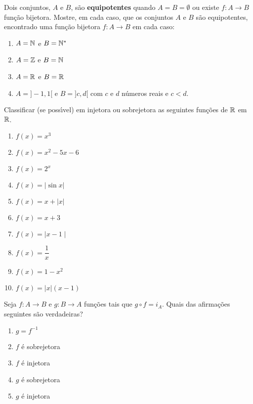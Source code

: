\documentclass[12pt]{exam}
\begin{document}
\vspace{.3cm}

\questao{} Dois conjuntos, $A$ e $B$, s\~ao \textbf{equipotentes} quando $A = B = \emptyset$ ou existe $f : A \to B$ fun\c{c}\~ao	bijetora. Mostre, em cada caso, que os conjuntos $A$ e $B$ s\~ao equipotentes, encontrado uma fun\c{c}\~ao bijetora $f : A \to B$ em cada caso:
\begin{enumerate}[label={\alph*})]
	\item $A = \mathbb{N}$ e $B = \mathbb{N}^*$
	\item $A = \mathbb{Z}$ e $B = \mathbb{N}$
	\item $A = \mathbb{R}$ e $B = \mathbb{R}$
	\item $A = ]-1, 1[$ e $B = ]c,d[$ com $c$ e $d$ n\'umeros reais e $c < d$.
\end{enumerate}

\newpage

\questao{} Classificar (se poss{\'\i}vel) em injetora ou sobrejetora as seguintes fun{\c c}{\~o}es de $\mathbb{R}$ em $\mathbb{R}$.

\begin{multicols}{2}
	\begin{enumerate}[label={\alph*})]
		\item $f(x) = x^3$
		\item $f(x) = x^2 - 5x - 6$
		\item $f(x) = 2^x$
		\item $f(x) = | \sin x |$
		\item $f(x) = x + | x |$
		\item $f(x) = x + 3$
		\item $f(x) = \mid x - 1\mid$
		\item $f(x) = \dfrac{1}{x}$
		\item $f(x) = 1 - x^2$
		\item $f(x) = |x|(x - 1)$
	\end{enumerate}
\end{multicols}

\vspace{.3cm}

\questao{} Seja $f : A \to B$ e $g : B \to A$ fun\c{c}\~oes tais que $g \circ f = i_A$. Quais das afirma\c{c}\~oes seguintes s\~ao verdadeiras?
\begin{enumerate}[label={\alph*})]
	\item $g = f^{-1}$
	\item $f$ \'e sobrejetora
	\item $f$ \'e injetora
	\item $g$ \'e sobrejetora
	\item $g$ \'e injetora
\end{enumerate}
\end{document}
